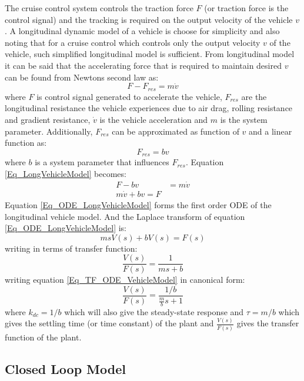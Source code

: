 The cruise control system controls the traction force $F$ (or traction force is the control signal) and the tracking is required on the output velocity of the vehicle $v$. A longitudinal dynamic model of a vehicle is choose for simplicity and also noting that for a cruise control which controls only the output velocity $v$ of the vehicle, such simplified longitudinal model is sufficient. From longitudinal model it can be said that the accelerating force that is required to maintain desired $v$ can be found from Newtons second law as:
\begin{equation} \label{Eq_LongVehicleModel}
	F - F_{res} = m \dot{v}
\end{equation}
where $F$ is control signal generated to accelerate the vehicle, $F_{res}$ are the longitudinal resistance the vehicle experiences due to air drag, rolling resistance and gradient resistance, $\dot{v}$ is the vehicle acceleration and $m$ is the system parameter. Additionally, $F_{res}$ can be approximated as function of $v$ and a linear function as:
\begin{equation}
	F_{res} = b v
\end{equation}
where $b$ is a system parameter that influences $F_{res}$. Equation \ref{Eq_LongVehicleModel} becomes:
\begin{align}
	F - b v &= m \dot{v} \\
	m \dot{v} + b v = F \label{Eq_ODE_LongVehicleModel}
\end{align}
Equation \eqref{Eq_ODE_LongVehicleModel} forms the first order ODE of the longitudinal vehicle model. And the Laplace transform of equation \eqref{Eq_ODE_LongVehicleModel} is:
\begin{equation} \label{Eq_LP_ODE_VehicleModel}
	m s V(s) + b V(s) = F(s)
\end{equation}
writing in terms of transfer function:
\begin{equation} \label{Eq_TF_ODE_VehicleModel}
	\frac{V(s)}{F(s)} = \frac{1}{ms + b}
\end{equation}
writing equation \eqref{Eq_TF_ODE_VehicleModel} in canonical form:
\begin{equation}
	\frac{V(s)}{F(s)} = \frac{1/b}{\frac{m}{b}s + 1}
\end{equation}
where $k_{dc} = 1/b$ which will also give the steady-state response and $\tau = m/b$ which gives the settling time (or time constant) of the plant and $\frac{V(s)}{F(s)}$ gives the transfer function of the plant. 

\subsection{Closed Loop Model}

